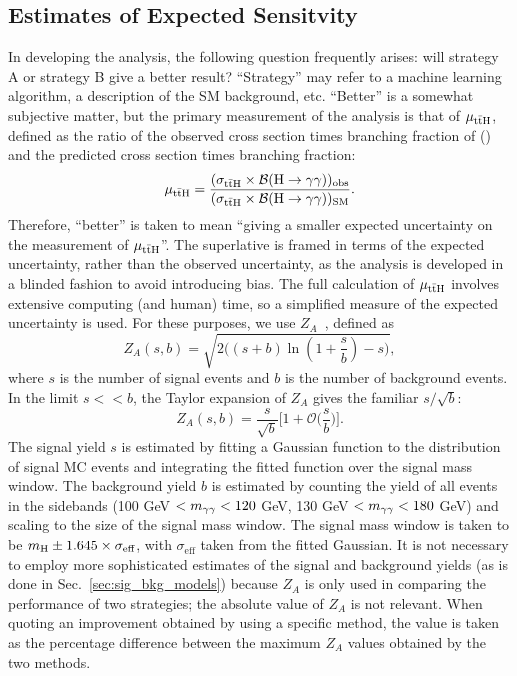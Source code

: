 \subsection{Estimates of Expected Sensitvity} \label{sec:tth_za}
In developing the \ttH analysis, the following question frequently arises: will strategy A or strategy B give a better result?
``Strategy'' may refer to a machine learning algorithm, a description of the SM background, etc.
``Better'' is a somewhat subjective matter, but the primary measurement of the \ttH analysis is that of $\mu_{\mathrm{t\bar{t}H}}$, defined as the ratio of the observed cross section times branching fraction of \ttH (\Hgg) and the predicted cross section times branching fraction:
\begin{equation}
    \mu_{\mathrm{t\bar{t}H}} = \frac{(\sigma_{\mathrm{t\bar{t}H}} \times \mathcal B (\mathrm{H\to\gamma\gamma}))_{\text{obs}}}{(\sigma_{\mathrm{t\bar{t}H}} \times \mathcal B (\mathrm{H\to\gamma\gamma}))_{\text{SM}}}.
\end{equation}
Therefore, ``better'' is taken to mean ``giving a smaller expected uncertainty on the measurement of $\mu_{\mathrm{t\bar{t}H}}$''.
The superlative is framed in terms of the expected uncertainty, rather than the observed uncertainty, as the analysis is developed in a blinded fashion to avoid introducing bias.
The full calculation of $\mu_{\mathrm{t\bar{t}H}}$ involves extensive computing (and human) time, so a simplified measure of the expected uncertainty is used.
For these purposes, we use $Z_A$~\cite{cowan_za}, defined as
\begin{equation}
    Z_A(s,b) = \sqrt{2 \bigg((s+b)\ln(1 + \frac{s}{b})-s\bigg)},
\end{equation}
where $s$ is the number of signal events and $b$ is the number of background events.
In the limit $s<<b$, the Taylor expansion of $Z_A$ gives the familiar $s/\sqrt{b}$:
\begin{equation}
    Z_A(s,b) = \frac{s}{\sqrt{b}}\bigg[1 + \mathcal O \bigg(\frac{s}{b}\bigg) \Bigg].
\end{equation}
The signal yield $s$ is estimated by fitting a Gaussian function to the \mgg distribution of signal MC events and integrating the fitted function over the signal mass window.
The background yield $b$ is estimated by counting the yield of all events in the \mgg sidebands (100 GeV $< m_{\gamma\gamma} < 120$ GeV, 130 GeV $< m_{\gamma\gamma} < 180$ GeV) and scaling to the size of the signal mass window.
The signal mass window is taken to be $m_{\mathrm{H}} \pm 1.645 \times \sigma_{\text{eff}}$, with $\sigma_{\text{eff}}$ taken from the fitted Gaussian.
It is not necessary to employ more sophisticated estimates of the signal and background yields (as is done in Sec.~\ref{sec:sig_bkg_models}) because $Z_A$ is only used in comparing the performance of two strategies; the absolute value of $Z_A$ is not relevant.
When quoting an improvement obtained by using a specific method, the value is taken as the percentage difference between the maximum $Z_A$ values obtained by the two methods.
